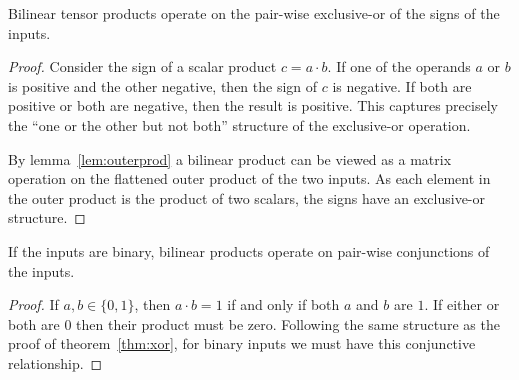 \begin{thm}  \label{thm:xor}
Bilinear tensor products operate on the pair-wise exclusive-or of the
signs of the inputs.
\end{thm}
\begin{proof}
Consider the sign of a scalar product
\(c = a\cdot b\). If one of the operands \(a\) or \(b\) is positive and the other negative,
then the sign of \(c\) is negative. If both are positive or both are negative, then the
result is positive. This captures precisely the ``one or the other but not both'' structure
of the exclusive-or operation.

By lemma~\ref{lem:outerprod} a bilinear product can be viewed as a matrix operation on the flattened
outer product of the two inputs. As each element in the outer product is the product of two scalars,
the signs have an exclusive-or structure.
\end{proof}

\begin{cor}\label{cor:and}
If the inputs are binary, bilinear products operate on pair-wise conjunctions of the inputs.
\end{cor}
\begin{proof}
If \(a, b \in \{0, 1\}\), then \(a \cdot b = 1\) if and only if both \(a\) and \(b\) are \(1\). If
either or both are \(0\) then their product must be zero. Following the same structure as the proof
of theorem~\ref{thm:xor}, for binary inputs we must have this conjunctive relationship.
\end{proof}

